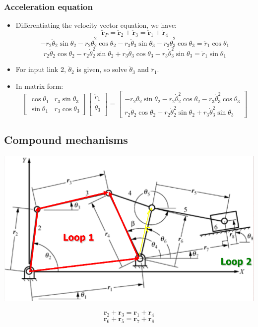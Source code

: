 \documentclass[11pt]{article}
\begin{document}
\subsubsection{Acceleration equation}
\label{sec:org4d2805a}
\begin{itemize}
\item Differentiating the velocity vector equation, we have:
\[\ddot{\boldsymbol{r}}_P = \ddot{\boldsymbol{r}}_2 + \ddot{\boldsymbol{r}}_3 = \ddot{\boldsymbol{r}}_1 + \ddot{\boldsymbol{r}}_4\]
\[-r_2 \ddot{\theta}_2 \sin \theta_2 - r_2 \dot{\theta}_2^2 \cos \theta_2 - r_3 \ddot{\theta}_3 \sin \theta_3 - r_3 \dot{\theta}_3^2 \cos \theta_3 = \ddot{r}_1 \cos \theta_1\]
\[r_2 \ddot{\theta}_2 \cos \theta_2 - r_2 \dot{\theta}_2^2 \sin \theta_2 + r_3 \ddot{\theta}_3 \cos \theta_3 - r_3 \dot{\theta}_3^2 \sin \theta_3 = \ddot{r}_1 \sin \theta_1\]
\item For input link 2, \(\ddot{\theta}_2\) is given, so solve \(\ddot{\theta}_3\) and \(\ddot{r}_1\).
\item In matrix form:
\begin{displaymath}
\begin{bmatrix}
\cos \theta_1 & r_3 \sin \theta_3 \\
\sin \theta_1 & r_3 \cos \theta_3
\end{bmatrix}
\begin{bmatrix}
\ddot{r}_1 \\
\ddot{\theta}_3 \\
\end{bmatrix} = \begin{bmatrix}
-r_2 \ddot{\theta}_2 \sin \theta_2 - r_2 \dot{\theta}_2^2 \cos \theta_2 - r_3 \dot{\theta}_3^2 \cos \theta_3 \\
r_2 \ddot{\theta}_2 \cos \theta_2 - r_2 \dot{\theta}_2^2 \sin \theta_2 + r_3 \dot{\theta}_3^2 \sin \theta_3
\end{bmatrix}
\end{displaymath}
\end{itemize}
\subsection{Compound mechanisms}
\label{sec:orgadeb1ff}
\begin{center}
\includegraphics[width=.9\linewidth]{./images/vector-loop-compound-mechanisms.png}
\end{center}
\[\boldsymbol{r}_2 + \boldsymbol{r}_3 = \boldsymbol{r}_1 + \boldsymbol{r}_4 \tag{Loop 1}\]
\[\boldsymbol{r}_6 + \boldsymbol{r}_5 = \boldsymbol{r}_7 + \boldsymbol{r}_8 \tag{Loop 2}\]
\end{document}
